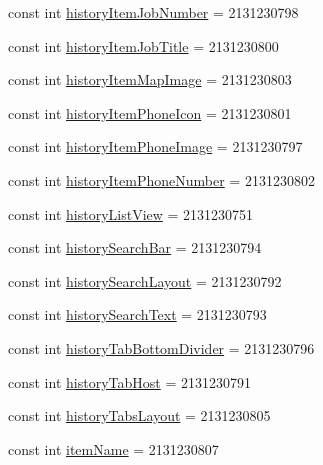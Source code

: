 \begin{DoxyCompactItemize}
\item 
const int \hyperlink{class_field_service_1_1_android_1_1_resource_1_1_id_aa5b264035f4d2e2769676fb7315c4e4d}{history\+Item\+Job\+Number} = 2131230798
\item 
const int \hyperlink{class_field_service_1_1_android_1_1_resource_1_1_id_a12b2fde3274bdfd56a7cc4ad767cb5c6}{history\+Item\+Job\+Title} = 2131230800
\item 
const int \hyperlink{class_field_service_1_1_android_1_1_resource_1_1_id_adb1a5722d804c0cb778cf9f043d47c3e}{history\+Item\+Map\+Image} = 2131230803
\item 
const int \hyperlink{class_field_service_1_1_android_1_1_resource_1_1_id_a28643e8036997fa440410b71dd2b29bc}{history\+Item\+Phone\+Icon} = 2131230801
\item 
const int \hyperlink{class_field_service_1_1_android_1_1_resource_1_1_id_ab83c8124dd74872cc2028afa302e8e66}{history\+Item\+Phone\+Image} = 2131230797
\item 
const int \hyperlink{class_field_service_1_1_android_1_1_resource_1_1_id_a9312e6939163ca9eb6ab97d41214211c}{history\+Item\+Phone\+Number} = 2131230802
\item 
const int \hyperlink{class_field_service_1_1_android_1_1_resource_1_1_id_a8cb917520f1630f9b634b3c11b80bbb1}{history\+List\+View} = 2131230751
\item 
const int \hyperlink{class_field_service_1_1_android_1_1_resource_1_1_id_a3fbd8fcaadfa36a07885b11fe355cb35}{history\+Search\+Bar} = 2131230794
\item 
const int \hyperlink{class_field_service_1_1_android_1_1_resource_1_1_id_a5c3e069a916388bc2903833f561e0aa5}{history\+Search\+Layout} = 2131230792
\item 
const int \hyperlink{class_field_service_1_1_android_1_1_resource_1_1_id_a0cca10e0d07aa595e313a38f0cc633ec}{history\+Search\+Text} = 2131230793
\item 
const int \hyperlink{class_field_service_1_1_android_1_1_resource_1_1_id_aa6137801a5995cb198fd12aa5085f5e9}{history\+Tab\+Bottom\+Divider} = 2131230796
\item 
const int \hyperlink{class_field_service_1_1_android_1_1_resource_1_1_id_a926fb99bc709fbd9681a40fc1af4709c}{history\+Tab\+Host} = 2131230791
\item 
const int \hyperlink{class_field_service_1_1_android_1_1_resource_1_1_id_a696856f0c1225005c7e36038a119616a}{history\+Tabs\+Layout} = 2131230805
\item 
const int \hyperlink{class_field_service_1_1_android_1_1_resource_1_1_id_a3cc776eb0f70080be33e251856c6c6c9}{item\+Name} = 2131230807

\end{DoxyCompactItemize}
